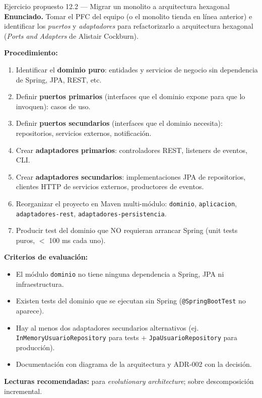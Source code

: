 \documentclass[11pt,a4paper,openany]{book}
\begin{document}
\begin{cajaejercicio}{Ejercicio propuesto 12.2 --- Migrar un monolito a arquitectura hexagonal}
\textbf{Enunciado.} Tomar el PFC del equipo (o el monolito tienda en
línea anterior) e identificar los \emph{puertos} y \emph{adaptadores}
para refactorizarlo a arquitectura hexagonal (\emph{Ports and
Adapters} de Alistair Cockburn).

\textbf{Procedimiento:}
\begin{enumerate}
\item Identificar el \textbf{dominio puro}: entidades y servicios
de negocio sin dependencia de Spring, JPA, REST, etc.
\item Definir \textbf{puertos primarios} (interfaces que el dominio
expone para que lo invoquen): casos de uso.
\item Definir \textbf{puertos secundarios} (interfaces que el dominio
necesita): repositorios, servicios externos, notificación.
\item Crear \textbf{adaptadores primarios}: controladores REST,
listeners de eventos, CLI.
\item Crear \textbf{adaptadores secundarios}: implementaciones JPA
de repositorios, clientes HTTP de servicios externos, productores de
eventos.
\item Reorganizar el proyecto en Maven multi-módulo:
\texttt{dominio}, \texttt{aplicacion}, \texttt{adaptadores-rest},
\texttt{adaptadores-persistencia}.
\item Producir test del dominio que NO requieran arrancar Spring
(unit tests puros, $<$ 100 ms cada uno).
\end{enumerate}

\textbf{Criterios de evaluación:}
\begin{itemize}
\item El módulo \texttt{dominio} no tiene ninguna dependencia a
Spring, JPA ni infraestructura.
\item Existen tests del dominio que se ejecutan sin Spring
(\texttt{@SpringBootTest} no aparece).
\item Hay al menos dos adaptadores secundarios alternativos
(ej. \texttt{InMemoryUsuarioRepository} para tests +
\texttt{JpaUsuarioRepository} para producción).
\item Documentación con diagrama de la arquitectura y ADR-002 con la
decisión.
\end{itemize}

\textbf{Lecturas recomendadas:} \cite{ford2017building} para
\emph{evolutionary architecture}; \cite{newman2021building} sobre
descomposición incremental.
\end{cajaejercicio}
\end{document}
